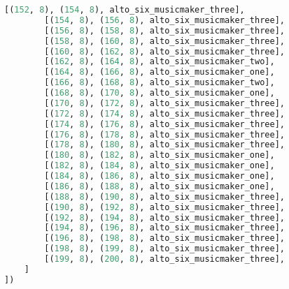 \begin{lstlisting}[language=Python, caption=Invocation Source Code]
        [(152, 8), (154, 8), alto_six_musicmaker_three],
        [(154, 8), (156, 8), alto_six_musicmaker_three],
        [(156, 8), (158, 8), alto_six_musicmaker_three],
        [(158, 8), (160, 8), alto_six_musicmaker_three],
        [(160, 8), (162, 8), alto_six_musicmaker_three],
        [(162, 8), (164, 8), alto_six_musicmaker_two],
        [(164, 8), (166, 8), alto_six_musicmaker_one],
        [(166, 8), (168, 8), alto_six_musicmaker_two],
        [(168, 8), (170, 8), alto_six_musicmaker_one],
        [(170, 8), (172, 8), alto_six_musicmaker_three],
        [(172, 8), (174, 8), alto_six_musicmaker_three],
        [(174, 8), (176, 8), alto_six_musicmaker_three],
        [(176, 8), (178, 8), alto_six_musicmaker_three],
        [(178, 8), (180, 8), alto_six_musicmaker_three],
        [(180, 8), (182, 8), alto_six_musicmaker_one],
        [(182, 8), (184, 8), alto_six_musicmaker_one],
        [(184, 8), (186, 8), alto_six_musicmaker_one],
        [(186, 8), (188, 8), alto_six_musicmaker_one],
        [(188, 8), (190, 8), alto_six_musicmaker_three],
        [(190, 8), (192, 8), alto_six_musicmaker_three],
        [(192, 8), (194, 8), alto_six_musicmaker_three],
        [(194, 8), (196, 8), alto_six_musicmaker_three],
        [(196, 8), (198, 8), alto_six_musicmaker_three],
        [(198, 8), (199, 8), alto_six_musicmaker_three],
        [(199, 8), (200, 8), alto_six_musicmaker_three],
    ]
])


\end{lstlisting}
